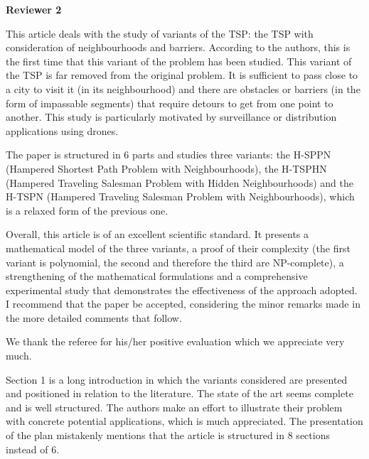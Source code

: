 \documentclass{article}
\newenvironment{reviewer}{\setcounter{pointcounter}{1}}{}
\newcommand{\point}{\text{{\selectfont \thepointcounter} \stepcounter{pointcounter}}}
\begin{document}
	\begin{reviewer}
		
		\begin{tcolorbox}[breakable,enhanced,coltitle=black,colback=green!75!black,colframe=green!75!black,borderline={1pt}{0pt}{black},boxrule=0pt]
			\textbf{Reviewer 2}
		\end{tcolorbox}
		
		\begin{itshape}
			This article deals with the study of variants of the TSP: the TSP with consideration of neighbourhoods and barriers. According to the authors, this is the first time that this variant of the problem has been studied. This variant of the TSP is far removed from the original problem. It is sufficient to pass close to a city to visit it (in its neighbourhood) and there are obstacles or barriers (in the form of impassable segments) that require detours to get from one point to another. This study is particularly motivated by surveillance or distribution applications using drones.
			
			The paper is structured in 6 parts and studies three variants: the H-SPPN (Hampered Shortest Path Problem with Neighbourhoods), the H-TSPHN (Hampered Traveling Salesman Problem with Hidden Neighbourhoods) and the H-TSPN (Hampered Traveling Salesman Problem with Neighbourhoods), which is a relaxed form of the previous one.
			
			Overall, this article is of an excellent scientific standard. It presents a mathematical model of the three variants, a proof of their complexity (the first variant is polynomial, the second and therefore the third are NP-complete), a strengthening of the mathematical formulations and a comprehensive experimental study that demonstrates the effectiveness of the approach adopted. I recommend that the paper be accepted, considering the minor remarks made in the more detailed comments that follow.
		\end{itshape}
		
		\begin{tcolorbox}[breakable,enhanced,coltitle=black,colback=green!5!white,colframe=green!75!black,title=\textbf{Answer R2.\point},borderline={1pt}{0pt}{black},boxrule=0pt]
		We thank the referee for his/her positive evaluation which we appreciate very much.
			
		\end{tcolorbox}
		
		\begin{itshape}
			Section 1 is a long introduction in which the variants considered are presented and positioned in relation to the literature. The state of the art seems complete and is well structured. The authors make an effort to illustrate their problem with concrete potential applications, which is much appreciated. The presentation of the plan mistakenly mentions that the article is structured in 8 sections instead of 6.
		\end{itshape}
		

\end{reviewer}
\end{document}
